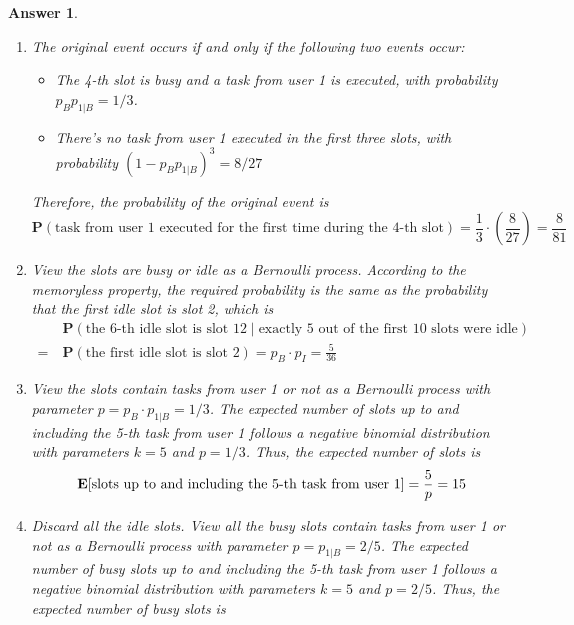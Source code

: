 \documentclass[utf8]{article}
\theoremstyle{definition}%
\theoremstyle{plain}%
\newtheorem{answer}{Answer} %
\begin{document}
\begin{answer} ~
    \begin{enumerate}[label=(\alph*)]
        \item The original event occurs if and only if the following two events occur: \begin{itemize}
            \item The 4-th slot is busy and a task from user 1 is executed, with probability $p_B p_{1|B} = 1/3$.
            \item There's no task from user 1 executed in the first three slots, with probability $(1 - p_B p_{1|B})^3 = 8/27$
        \end{itemize}
        Therefore, the probability of the original event is
        \begin{equation}
            \mathbf{P}(\text{task from user 1 executed for the first time during the 4-th slot}) = \frac{1}{3} \cdot \left(\frac{8}{27}\right) = \frac{8}{81}
        \end{equation}
        \item View the slots are busy or idle as a Bernoulli process. According to the memoryless property, the required probability is the same as the probability that the first idle slot is slot 2, which is 
        \begin{equation}
        \begin{aligned}
            &\mathbf{P}(\text{the 6-th idle slot is slot 12} \mid \text{exactly 5 out of the first 10 slots were idle}) \\ 
            =~ &\mathbf{P}(\text{the first idle slot is slot 2}) = p_B \cdot p_I = \frac{5}{36}
        \end{aligned}
        \end{equation}
        \item View the slots contain tasks from user 1 or not as a Bernoulli process with parameter $p = p_B \cdot p_{1|B} = 1/3$. The expected number of slots up to and including the 5-th task from user 1 follows a negative binomial distribution with parameters $k = 5$ and $p = 1/3$. Thus, the expected number of slots is 
        \begin{equation}
            \mathbf{E}[\text{slots up to and including the 5-th task from user 1}] = \frac{5}{p} = 15
        \end{equation}
        \item \label{a:2.d} Discard all the idle slots. View all the busy slots contain tasks from user 1 or not as a Bernoulli process with parameter $p = p_{1|B} = 2/5$. The expected number of busy slots up to and including the 5-th task from user 1 follows a negative binomial distribution with parameters $k = 5$ and $p = 2/5$. Thus, the expected number of busy slots is

\end{enumerate}
\end{answer}
\end{document}
